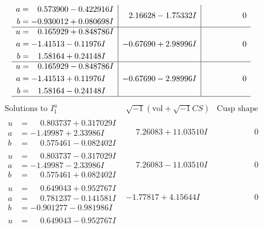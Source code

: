 \documentclass[1p]{elsarticle_modified}
\theoremstyle{definition}
\newcommand{\I}{\sqrt{-1}}
\begin{document}
$$\begin{array}{c|c|c}
\begin{aligned}
a &= \phantom{-}0.573900 - 0.422916 I \\
b &= -0.930012 + 0.080698 I\end{aligned}
 & \phantom{-}2.16628 - 1.75332 I & \phantom{-0.000000 } 0 \\ \hline\begin{aligned}
u &= \phantom{-}0.165929 + 0.848786 I \\
a &= -1.41513 - 0.11976 I \\
b &= \phantom{-}1.58164 + 0.24148 I\end{aligned}
 & -0.67690 + 2.98996 I & \phantom{-0.000000 } 0 \\ \hline\begin{aligned}
u &= \phantom{-}0.165929 - 0.848786 I \\
a &= -1.41513 + 0.11976 I \\
b &= \phantom{-}1.58164 - 0.24148 I\end{aligned}
 & -0.67690 - 2.98996 I & \phantom{-0.000000 } 0\\
 \hline 
 \end{array}$$\newpage$$\begin{array}{c|c|c}  
\text{Solutions to }I^u_{1}& \I (\text{vol} + \sqrt{-1}CS) & \text{Cusp shape}\\
 \hline 
\begin{aligned}
u &= \phantom{-}0.803737 + 0.317029 I \\
a &= -1.49987 + 2.33986 I \\
b &= \phantom{-}0.575461 - 0.082402 I\end{aligned}
 & \phantom{-}7.26083 + 11.03510 I & \phantom{-0.000000 } 0 \\ \hline\begin{aligned}
u &= \phantom{-}0.803737 - 0.317029 I \\
a &= -1.49987 - 2.33986 I \\
b &= \phantom{-}0.575461 + 0.082402 I\end{aligned}
 & \phantom{-}7.26083 - 11.03510 I & \phantom{-0.000000 } 0 \\ \hline\begin{aligned}
u &= \phantom{-}0.649043 + 0.952767 I \\
a &= \phantom{-}0.781237 - 0.141581 I \\
b &= -0.901277 - 0.981986 I\end{aligned}
 & -1.77817 + 4.15644 I & \phantom{-0.000000 } 0 \\ \hline\begin{aligned}
u &= \phantom{-}0.649043 - 0.952767 I \\

\end{aligned}
\end{array}$$
\end{document}

